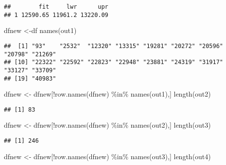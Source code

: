 \documentclass[
]{article}
\newenvironment{Shaded}{\begin{snugshade}}{\end{snugshade}}
\newcommand{\FunctionTok}[1]{\textcolor[rgb]{0.00,0.00,0.00}{#1}}
\newcommand{\NormalTok}[1]{#1}
\newcommand{\OtherTok}[1]{\textcolor[rgb]{0.56,0.35,0.01}{#1}}
\newcommand{\SpecialCharTok}[1]{\textcolor[rgb]{0.00,0.00,0.00}{#1}}
\begin{document}
\begin{verbatim}
##        fit     lwr      upr
## 1 12590.65 11961.2 13220.09
\end{verbatim}

\begin{Shaded}
\begin{Highlighting}[]
\NormalTok{dfnew }\OtherTok{\textless{}{-}}\NormalTok{df}
\FunctionTok{names}\NormalTok{(out1)}
\end{Highlighting}
\end{Shaded}

\begin{verbatim}
##  [1] "93"    "2532"  "12320" "13315" "19281" "20272" "20596" "20798" "21269"
## [10] "22322" "22592" "22823" "22948" "23881" "24319" "31917" "33127" "33709"
## [19] "40983"
\end{verbatim}

\begin{Shaded}
\begin{Highlighting}[]
\NormalTok{dfnew }\OtherTok{\textless{}{-}}\NormalTok{ dfnew[}\SpecialCharTok{!}\FunctionTok{row.names}\NormalTok{(dfnew) }\SpecialCharTok{\%in\%} \FunctionTok{names}\NormalTok{(out1),]}
\FunctionTok{length}\NormalTok{(out2)}
\end{Highlighting}
\end{Shaded}

\begin{verbatim}
## [1] 83
\end{verbatim}

\begin{Shaded}
\begin{Highlighting}[]
\NormalTok{dfnew }\OtherTok{\textless{}{-}}\NormalTok{ dfnew[}\SpecialCharTok{!}\FunctionTok{row.names}\NormalTok{(dfnew) }\SpecialCharTok{\%in\%} \FunctionTok{names}\NormalTok{(out2),]}
\FunctionTok{length}\NormalTok{(out3)}
\end{Highlighting}
\end{Shaded}

\begin{verbatim}
## [1] 246
\end{verbatim}

\begin{Shaded}
\begin{Highlighting}[]
\NormalTok{dfnew }\OtherTok{\textless{}{-}}\NormalTok{ dfnew[}\SpecialCharTok{!}\FunctionTok{row.names}\NormalTok{(dfnew) }\SpecialCharTok{\%in\%} \FunctionTok{names}\NormalTok{(out3),]}
\FunctionTok{length}\NormalTok{(out4)}
\end{Highlighting}
\end{Shaded}
\end{document}
